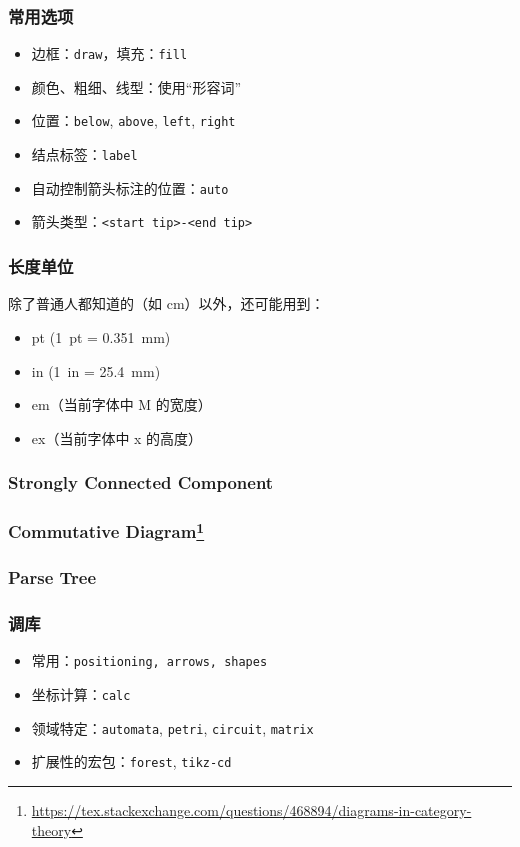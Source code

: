 \documentclass[usenames,xcolor=svgnames,11pt,sans,handout]{beamer}
\let\t\texttt
\begin{document}
\begin{frame}
    \frametitle{常用选项}

    \begin{itemize}
        \item 边框：\t{draw}，填充：\t{fill}
        \item 颜色、粗细、线型：使用“形容词”
        \item 位置：\t{below}, \t{above}, \t{left}, \t{right}
        \item 结点标签：\t{label}
        \item 自动控制箭头标注的位置：\t{auto}
        \item 箭头类型：\t{<start tip>-<end tip>}
    \end{itemize}
\end{frame}

\begin{frame}
    \frametitle{长度单位}

    除了普通人都知道的（如 \si{cm}）以外，还可能用到：
    \begin{itemize}
        \item \si{pt} (\SI{1}{pt} = \SI{0.351}{mm})
        \item \si{in} (\SI{1}{in} = \SI{25.4}{mm})
        \item \si{em}（当前字体中 M 的宽度）
        \item \si{ex}（当前字体中 x 的高度）
    \end{itemize}
\end{frame}

\begin{frame}
    \frametitle{Strongly Connected Component}

    \centering
\end{frame}

\begin{frame}
    \frametitle{Commutative Diagram\footnote{\url{https://tex.stackexchange.com/questions/468894/diagrams-in-category-theory}}}

    \centering
\end{frame}

\begin{frame}
    \frametitle{Parse Tree}

    \begin{center}
        \footnotesize
    \end{center}
\end{frame}

\begin{frame}
    \frametitle{调库}

    \begin{itemize}
        \item 常用：\t{positioning, arrows, shapes}
        \item 坐标计算：\t{calc}
        \item 领域特定：\t{automata}, \t{petri}, \t{circuit}, \t{matrix}
        \item 扩展性的宏包：\t{forest}, \t{tikz-cd}
    \end{itemize}
\end{frame}
\end{document}
